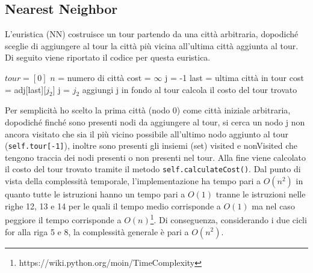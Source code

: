 \documentclass[a4paper,12pt]{report}
\begin{document}
\subsection{Nearest Neighbor}
L'euristica  (NN) costruisce un tour partendo da una città arbitraria, dopodiché sceglie di aggiungere al tour la città più vicina all'ultima città aggiunta al tour. Di seguito viene riportato il codice per questa euristica.
\begin{tcolorbox}[colframe=black, colback=white, boxrule=0.5pt, title=Nearest Neighbor, coltitle=black, fonttitle=\bfseries, colbacktitle=white]
  \begin{algorithmic}[1]
    \State $tour = [0]$
    \State $n$ = numero di città
        \State cost = $\infty$
        \State j = -1
          \State last = ultima città in tour
            \State cost = adj[last][$j_2$]
            \State j = $j_2$
          \EndIf
        \EndFor
        \State aggiungi j in fondo al tour
    \EndWhile
    \State calcola il costo del tour trovato
  \end{algorithmic}
\end{tcolorbox}
Per semplicità ho scelto la prima città (nodo 0) come città iniziale arbitraria, dopodiché finché sono presenti nodi da aggiungere al tour, si cerca un nodo j non ancora visitato che sia il più vicino possibile all'ultimo nodo aggiunto al tour (\lstinline!self.tour[-1]!), inoltre sono presenti gli insiemi (set) visited e nonVisited che tengono traccia dei nodi presenti o non presenti nel tour. Alla fine viene calcolato il costo del tour trovato tramite il metodo \lstinline!self.calculateCost()!. \newline
Dal punto di vista della complessità temporale, l'implementazione ha tempo pari a $O(n^2)$ in quanto tutte le istruzioni hanno un tempo pari a $O(1)$ tranne le istruzioni nelle righe 12, 13 e 14 per le quali il tempo medio corrisponde a $O(1)$ ma nel caso peggiore il tempo corrisponde a $O(n)$\footnote{https://wiki.python.org/moin/TimeComplexity}. Di conseguenza, considerando i due cicli for alla riga 5 e 8, la complessità generale è pari a $O(n^2)$.
\end{document}
